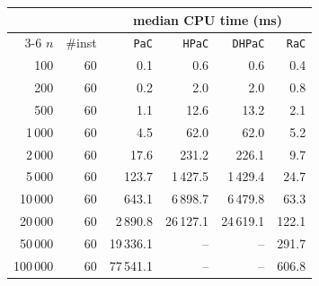 \begin{tabular}{@{}rrrrrr@{}}
\toprule
 &  & \multicolumn{4}{c}{median CPU time (ms)} \\
\cmidrule(l){3-6}
$n$ & \#inst & \texttt{PaC} & \texttt{HPaC} & \texttt{DHPaC} & \texttt{RaC} \\
\midrule
100 & 60 & 0.1 & 0.6 & 0.6 & 0.4 \\
200 & 60 & 0.2 & 2.0 & 2.0 & 0.8 \\
500 & 60 & 1.1 & 12.6 & 13.2 & 2.1 \\
1\,000 & 60 & 4.5 & 62.0 & 62.0 & 5.2 \\
2\,000 & 60 & 17.6 & 231.2 & 226.1 & 9.7 \\
5\,000 & 60 & 123.7 & 1\,427.5 & 1\,429.4 & 24.7 \\
10\,000 & 60 & 643.1 & 6\,898.7 & 6\,479.8 & 63.3 \\
20\,000 & 60 & 2\,890.8 & 26\,127.1 & 24\,619.1 & 122.1 \\
50\,000 & 60 & 19\,336.1 & -- & -- & 291.7 \\
100\,000 & 60 & 77\,541.1 & -- & -- & 606.8 \\
\bottomrule
\end{tabular}
